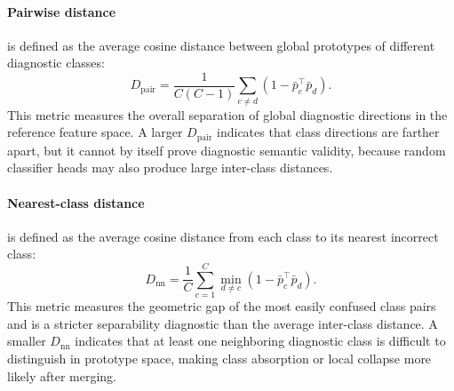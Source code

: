 \documentclass[letterpaper]{article}
\begin{document}
\paragraph{Pairwise distance}
is defined as the average cosine distance between global prototypes of different diagnostic classes:
\begin{equation}
D_{\mathrm{pair}}
=\frac{1}{C(C-1)}
\sum_{c\ne d}\left(1-\bar{p}_c^\top\bar{p}_d\right).
\end{equation}
This metric measures the overall separation of global diagnostic directions in the reference feature space. A larger $D_{\mathrm{pair}}$ indicates that class directions are farther apart, but it cannot by itself prove diagnostic semantic validity, because random classifier heads may also produce large inter-class distances.

\paragraph{Nearest-class distance}
is defined as the average cosine distance from each class to its nearest incorrect class:
\begin{equation}
D_{\mathrm{nn}}
=\frac{1}{C}\sum_{c=1}^{C}
\min_{d\ne c}\left(1-\bar{p}_c^\top\bar{p}_d\right).
\end{equation}
This metric measures the geometric gap of the most easily confused class pairs and is a stricter separability diagnostic than the average inter-class distance. A smaller $D_{\mathrm{nn}}$ indicates that at least one neighboring diagnostic class is difficult to distinguish in prototype space, making class absorption or local collapse more likely after merging.

\end{document}
